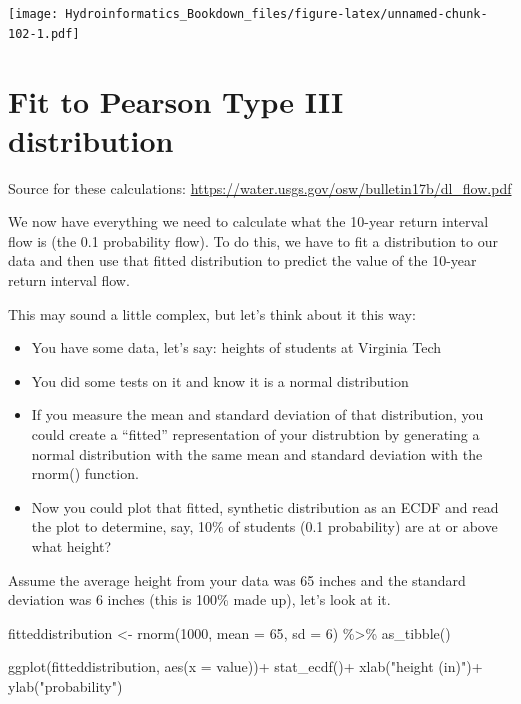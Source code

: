 \documentclass[
]{book}
\newenvironment{Shaded}{\begin{snugshade}}{\end{snugshade}}
\newcommand{\AttributeTok}[1]{\textcolor[rgb]{0.77,0.63,0.00}{#1}}
\newcommand{\DecValTok}[1]{\textcolor[rgb]{0.00,0.00,0.81}{#1}}
\newcommand{\FunctionTok}[1]{\textcolor[rgb]{0.00,0.00,0.00}{#1}}
\newcommand{\NormalTok}[1]{#1}
\newcommand{\OtherTok}[1]{\textcolor[rgb]{0.56,0.35,0.01}{#1}}
\newcommand{\SpecialCharTok}[1]{\textcolor[rgb]{0.00,0.00,0.00}{#1}}
\newcommand{\StringTok}[1]{\textcolor[rgb]{0.31,0.60,0.02}{#1}}
\providecommand{\tightlist}{%
  \setlength{\itemsep}{0pt}\setlength{\parskip}{0pt}}
\begin{document}
\texttt{[image: Hydroinformatics\_Bookdown\_files/figure-latex/unnamed-chunk-102-1.pdf]}

\hypertarget{fit-to-pearson-type-iii-distribution}{%
\section{Fit to Pearson Type III distribution}\label{fit-to-pearson-type-iii-distribution}}

Source for these calculations:
\url{https://water.usgs.gov/osw/bulletin17b/dl_flow.pdf}

We now have everything we need to calculate what the 10-year return interval flow is (the 0.1 probability flow). To do this, we have to fit a distribution to our data and then use that fitted distribution to predict the value of the 10-year return interval flow.

This may sound a little complex, but let's think about it this way:

\begin{itemize}
\tightlist
\item
  You have some data, let's say: heights of students at Virginia Tech
\item
  You did some tests on it and know it is a normal distribution
\item
  If you measure the mean and standard deviation of that distribution, you could create a ``fitted'' representation of your distrubtion by generating a normal distribution with the same mean and standard deviation with the rnorm() function.
\item
  Now you could plot that fitted, synthetic distribution as an ECDF and read the plot to determine, say, 10\% of students (0.1 probability) are at or above what height?
\end{itemize}

Assume the average height from your data was 65 inches and the standard deviation was 6 inches (this is 100\% made up), let's look at it.

\begin{Shaded}
\begin{Highlighting}[]
\NormalTok{fitteddistribution }\OtherTok{\textless{}{-}} \FunctionTok{rnorm}\NormalTok{(}\DecValTok{1000}\NormalTok{, }\AttributeTok{mean =} \DecValTok{65}\NormalTok{, }\AttributeTok{sd =} \DecValTok{6}\NormalTok{) }\SpecialCharTok{\%\textgreater{}\%}
  \FunctionTok{as\_tibble}\NormalTok{()}

\FunctionTok{ggplot}\NormalTok{(fitteddistribution, }\FunctionTok{aes}\NormalTok{(}\AttributeTok{x =}\NormalTok{ value))}\SpecialCharTok{+}
  \FunctionTok{stat\_ecdf}\NormalTok{()}\SpecialCharTok{+}
  \FunctionTok{xlab}\NormalTok{(}\StringTok{"height (in)"}\NormalTok{)}\SpecialCharTok{+}
  \FunctionTok{ylab}\NormalTok{(}\StringTok{"probability"}\NormalTok{)}
\end{Highlighting}
\end{Shaded}
\end{document}
